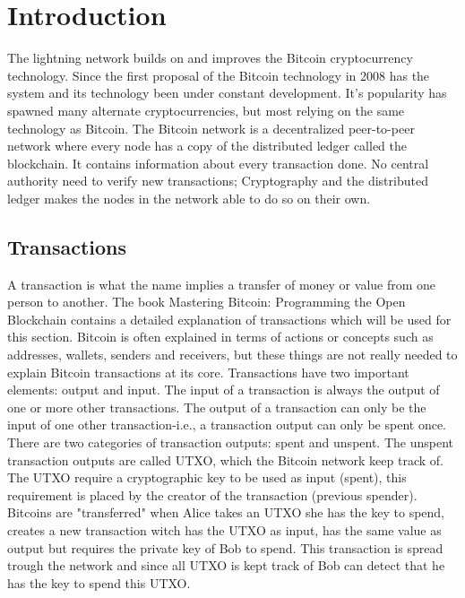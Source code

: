 \documentclass[informationsecurity]{gucmasterproject}
\begin{document}
\chapter{Introduction}

The lightning network builds on and improves the Bitcoin cryptocurrency technology. 
Since the first proposal of the Bitcoin technology in 2008\cite{nakamoto2008bitcoin} has the system and its technology been under constant development. It's popularity has spawned many alternate cryptocurrencies, but most relying on the same technology as Bitcoin. The Bitcoin network is a decentralized peer-to-peer network where every node has a copy of the distributed ledger called the blockchain. It contains information about every transaction done. No central authority need to verify new transactions; Cryptography and the distributed ledger makes the nodes in the network able to do so on their own.

\section{Transactions}
A transaction is what the name implies a transfer of money or value from one person to another. The book Mastering Bitcoin: Programming the Open Blockchain \cite{antonopoulos2017mastering} contains a detailed explanation of transactions which will be used for this section. Bitcoin is often explained in terms of actions or concepts such as addresses, wallets, senders and receivers, but these things are not really needed to explain Bitcoin transactions at its core. Transactions have two important elements: output and input. The input of a transaction is always the output of one or more other transactions. The output of a transaction can only be the input of one other transaction-i.e., a transaction output can only be spent once. There are two categories of transaction outputs: spent and unspent. The unspent transaction outputs are called UTXO, which the Bitcoin network keep track of. The UTXO require a cryptographic key to be used as input (spent), this requirement is placed by the creator of the transaction (previous spender). Bitcoins are "transferred" when Alice takes an UTXO she has the key to spend, creates a new transaction witch has the UTXO as input, has the same value as output but requires the private key of Bob to spend. This transaction is spread trough the network and since all UTXO is kept track of Bob can detect that he has the key to spend this UTXO.
\end{document}
